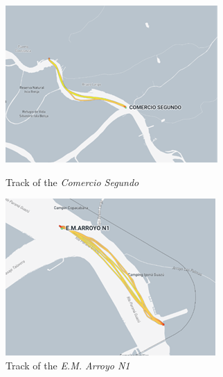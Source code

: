 \begin{figure}[H]
    \centering
    \begin{minipage}{0.48\textwidth}
        \centering
        \includegraphics[width=\linewidth]{figures/ch5/Track_CS.png}
        \caption{Track of the \textit{Comercio Segundo}}
        \label{fig:track_cs}
    \end{minipage}\hfill
    \begin{minipage}{0.48\textwidth}
        \centering
        \includegraphics[width=\linewidth]{figures/ch5/Track_EM.png}
        \caption{Track of the \textit{E.M. Arroyo N1}}
        \label{fig:track_em}
    \end{minipage}
\end{figure}


